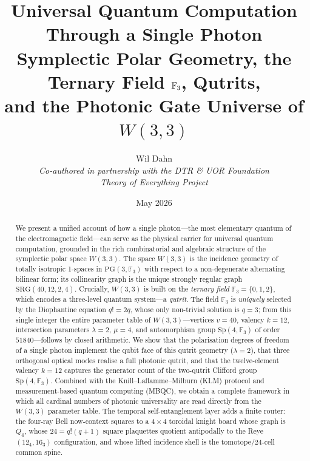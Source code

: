 ﻿\documentclass[12pt]{article}
\title{\textbf{Universal Quantum Computation Through a Single Photon}\\[6pt]
\large Symplectic Polar Geometry, the Ternary Field $\GF{3}$, Qutrits,\\
and the Photonic Gate Universe of $W(3,3)$}
\author{%
  Wil Dahn\\[4pt]
  \normalsize\textit{Co-authored in partnership with the DTR \& UOR Foundation}\\[2pt]
  \normalsize\textit{Theory of Everything Project}%
}
\date{May 2026}
\newcommand{\FF}{\mathbb{F}}
\newcommand{\Sp}{\mathrm{Sp}}
\newcommand{\SRG}[4]{\mathrm{SRG}(#1,#2,#3,#4)}
\newcommand{\GF}[1]{\mathbb{F}_{#1}}
\newcommand{\PG}[2]{\mathrm{PG}(#1,#2)}
\begin{document}
\par\noindent{}\par\medskip

\maketitle

\begin{abstract}
We present a unified account of how a single photon---the most elementary quantum of
the electromagnetic field---can serve as the physical carrier for universal quantum
computation, grounded in the rich combinatorial and algebraic structure of the
symplectic polar space $W(3,3)$.  The space $W(3,3)$ is the incidence geometry of
totally isotropic 1-spaces in $\PG{3}{\GF{3}}$ with respect to a non-degenerate
alternating bilinear form; its collinearity graph is the unique strongly regular
graph $\SRG{40}{12}{2}{4}$.  Crucially, $W(3,3)$ is built on the \emph{ternary
field} $\GF{3} = \{0,1,2\}$, which encodes a three-level quantum system---a
\emph{qutrit}.  The field $\GF{3}$ is \emph{uniquely} selected by the Diophantine
equation $q! = 2q$, whose only non-trivial solution is $q = 3$; from this single
integer the entire parameter table of $W(3,3)$---vertices $v=40$, valency $k=12$,
intersection parameters $\lambda=2$, $\mu=4$, and automorphism group
$\Sp(4,\FF_3)$ of order $51840$---follows by closed arithmetic.  We show that the
polarisation degrees of freedom of a single photon implement the qubit face of this
qutrit geometry ($\lambda = 2$), that three orthogonal optical modes realise a full
photonic qutrit, and that the twelve-element valency $k=12$ captures the generator
count of the two-qutrit Clifford group $\Sp(4,\FF_3)$.  Combined with the
Knill--Laflamme--Milburn (KLM) protocol and measurement-based quantum computing
(MBQC), we obtain a complete framework in which all cardinal numbers of photonic
universality are read directly from the $W(3,3)$ parameter table.  The temporal
self-entanglement layer adds a finite router: the four-ray Bell now-context
squares to a $4\times4$ toroidal knight board whose graph is $Q_4$, whose
$24=q!(q+1)$ square plaquettes quotient antipodally to the Reye
$(12_4,16_3)$ configuration, and whose lifted incidence shell is the
tomotope/$24$-cell common spine.
\end{abstract}
\end{document}
